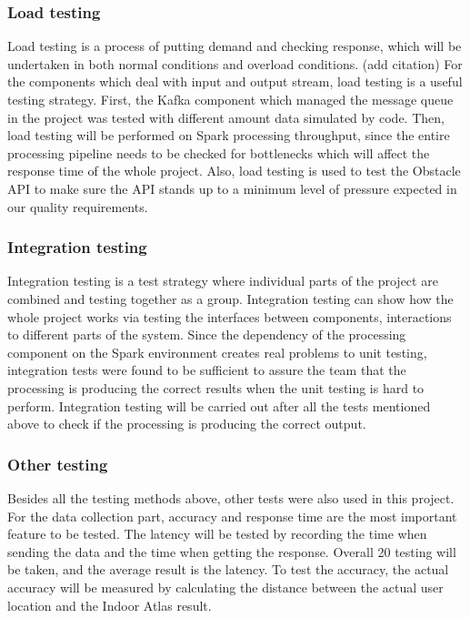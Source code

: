 \documentclass[prodmode,acmtosem]{acmsmall} %
\begin{document}
\subsubsection{Load testing}
Load testing is a process of putting demand and checking response, which will be undertaken in both normal conditions and overload conditions. (add citation) For the components which deal with input and output stream, load testing is a useful testing strategy.
First, the Kafka component which managed the message queue in the project was tested with different amount data simulated by code. Then, load testing will be performed on Spark processing throughput, since the entire processing pipeline needs to be checked for bottlenecks which will affect the response time of the whole project. Also, load testing is used to test the Obstacle API to make sure the API stands up to a minimum level of pressure expected in our quality requirements.

\subsubsection{Integration testing}
Integration testing is a test strategy where individual parts of the project are combined and testing together as a group.\cite{jorgensen1994object} Integration testing can show how the whole project works via testing the interfaces between components, interactions to different parts of the system. 
Since the dependency of the processing component on the Spark environment creates real problems to unit testing, integration tests were found to be sufficient to assure the team that the processing is producing the correct results when the unit testing is hard to perform.
Integration testing will be carried out after all the tests mentioned above to check if the processing is producing the correct output.
\subsubsection{Other testing}
Besides all the testing methods above, other tests were also used in this project. For the data collection part, accuracy and response time are the most important feature to be tested. The latency will be tested by recording the time when sending the data and the time when getting the response. Overall 20 testing will be taken, and the average result is the latency. To test the accuracy, the actual accuracy will be measured by calculating the distance between the actual user location and the Indoor Atlas result.
\end{document}
